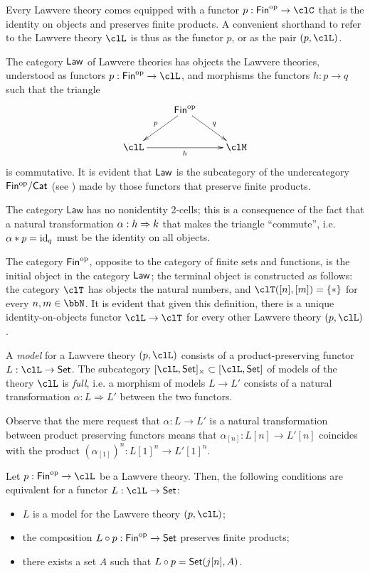 Every Lawvere theory comes equipped with a functor $p : \cate{Fin}^\op \to \clC$ that is the identity on objects and preserves finite products. A convenient shorthand to refer to the Lawvere theory $\clL$ is thus as the functor $p$, or as the pair $(p,\clL)$.
\begin{definition}
  The category $\mathsf{Law}$ of Lawvere theories has objects the Lawvere theories, understood as functors $p : \cate{Fin}^\op \to \clL$, and morphisms the functors $h :  p\to q$ such that the triangle 
  \[\xymatrix{
    & \cate{Fin}^\op \ar[dr]^q \ar[dl]_p & \\ 
    \clL \ar[rr]_h && \clM 
  }\]
  is commutative. It is evident that $\mathsf{Law}$ is the subcategory of the undercategory $\mathsf{Fin^{\text{op}}}/\mathsf{Cat}$ (see \cite[]{}) made by those functors that preserve finite products.
\end{definition}
\begin{remark}
  The category $\textsf{Law}$ has no nonidentity 2-cells; this is a consequence of the fact that a natural transformation $\alpha : h \Rightarrow k$ that makes the triangle ``commute'', i.e. $\alpha * p = \text{id}_q$ must be the identity on all objects.
\end{remark}
\begin{example}
The category $\mathsf{Fin}^{\text{op}}$, opposite to the category of finite sets and functions, is the initial object in the category  $\mathsf{Law}$; the terminal object is constructed as follows: the category $\clT$ has objects the natural numbers, and $\clT([n],[m])=\{*\}$ for every $n,m\in \bbN$. It is evident that given this definition, there is a unique identity-on-objects functor $\clL \to \clT$ for every other Lawvere theory $(p,\clL)$.
\end{example}
\begin{definition}
    A \emph{model} for a Lawvere theory $(p ,\clL)$ consists of a product-preserving functor $L : \clL \to \Set$. The subcategory $[\clL,\Set]_\times \subset [\clL, \Set]$ of models of the theory $\clL$ is \emph{full}, i.e. a morphism of models $L \to L'$ consists of a natural transformation $\alpha : L \Rightarrow L'$ between the two functors.
\end{definition}
Observe that the mere request that $\alpha : L \to L'$ is a natural transformation between product preserving functors means that $\alpha_{[n]} : L[n] \to L'[n]$ coincides with the product $(\alpha_{[1]})^n : L[1]^n \to L'[1]^n$.
\begin{proposition}
  Let $p : \cate{Fin}^\op\to \clL$ be a Lawvere theory. Then, the following conditions are equivalent for a functor $L : \clL \to \Set$:
  \begin{itemize}
    \item $L$ is a model for the Lawvere theory $(p,\clL)$;
    \item the composition $L\circ p : \mathsf{Fin}^{\text{op}} \to \mathsf{Set}$ preserves finite products;
    \item there exists a set $A$ such that $L\circ p = \mathsf{Set}(j[n],A)$.
  \end{itemize}
\end{proposition}

